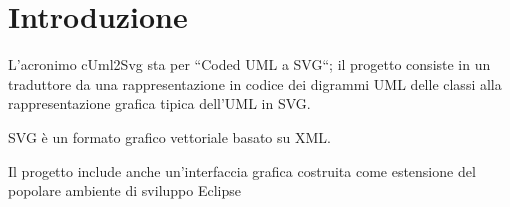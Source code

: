 \chapter{Introduzione}

L'acronimo cUml2Svg sta per ``Coded UML a SVG``; 
il progetto consiste in un traduttore da una rappresentazione
in codice dei digrammi UML delle classi alla rappresentazione grafica
tipica dell'UML in SVG.

SVG è un formato grafico vettoriale basato su XML.

Il progetto include anche un'interfaccia grafica costruita come estensione del
popolare ambiente di sviluppo Eclipse~\cite{eclipse_website}

